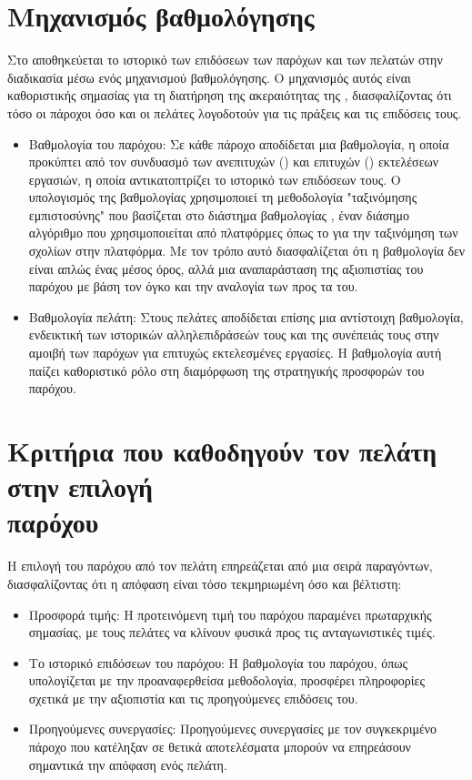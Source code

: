 \section{Μηχανισμός βαθμολόγησης}
Στο   αποθηκεύεται το ιστορικό των επιδόσεων των παρόχων και των πελατών στην διαδικασία μέσω ενός μηχανισμού βαθμολόγησης. Ο μηχανισμός αυτός είναι καθοριστικής σημασίας για τη διατήρηση της ακεραιότητας της , διασφαλίζοντας ότι τόσο οι πάροχοι όσο και οι πελάτες λογοδοτούν για τις πράξεις και τις επιδόσεις τους.
\begin{itemize}
    \item Βαθμολογία του παρόχου: Σε κάθε πάροχο αποδίδεται μια βαθμολογία, η οποία προκύπτει από τον συνδυασμό των ανεπιτυχών () και επιτυχών () εκτελέσεων εργασιών, η οποία αντικατοπτρίζει το ιστορικό των επιδόσεων τους. Ο υπολογισμός της βαθμολογίας χρησιμοποιεί τη μεθοδολογία "ταξινόμησης εμπιστοσύνης" που βασίζεται στο διάστημα βαθμολογίας , έναν διάσημο αλγόριθμο που χρησιμοποιείται από πλατφόρμες όπως το  για την ταξινόμηση των σχολίων στην πλατφόρμα. Με τον τρόπο αυτό διασφαλίζεται ότι η βαθμολογία δεν είναι απλώς ένας μέσος όρος, αλλά μια αναπαράσταση της αξιοπιστίας του παρόχου με βάση τον όγκο και την αναλογία των  προς τα  του. 
    \item Βαθμολογία πελάτη: Στους πελάτες αποδίδεται επίσης μια αντίστοιχη βαθμολογία, ενδεικτική των ιστορικών αλληλεπιδράσεών τους και της συνέπειάς τους στην αμοιβή των παρόχων για επιτυχώς εκτελεσμένες εργασίες. Η βαθμολογία αυτή παίζει καθοριστικό ρόλο στη διαμόρφωση της στρατηγικής προσφορών του παρόχου.
\end{itemize}

\section{Κριτήρια που καθοδηγούν τον πελάτη στην επιλογή \\παρόχου}
Η επιλογή του παρόχου από τον πελάτη επηρεάζεται από μια σειρά παραγόντων, διασφαλίζοντας ότι η απόφαση είναι τόσο τεκμηριωμένη όσο και βέλτιστη:
\begin{itemize}
    \item Προσφορά τιμής: Η προτεινόμενη τιμή του παρόχου παραμένει πρωταρχικής σημασίας, με τους πελάτες να κλίνουν φυσικά προς τις ανταγωνιστικές τιμές.
    \item Το ιστορικό επιδόσεων του παρόχου: Η βαθμολογία του παρόχου, όπως υπολογίζεται με την προαναφερθείσα μεθοδολογία, προσφέρει πληροφορίες σχετικά με την αξιοπιστία και τις προηγούμενες επιδόσεις του.
    \item Προηγούμενες συνεργασίες: Προηγούμενες συνεργασίες με τον συγκεκριμένο πάροχο που κατέληξαν σε θετικά αποτελέσματα μπορούν να επηρεάσουν σημαντικά την απόφαση ενός πελάτη.
\end{itemize}

